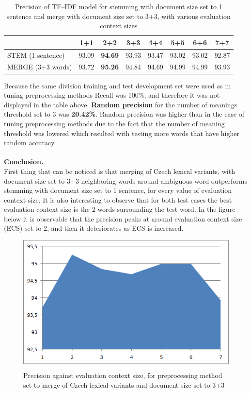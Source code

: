 \begin{table}[h!]
\begin{tabular}{ l | c c c c c c c}
    &  1+1 & 2+2 & 3+3 & 4+4 & 5+5 & 6+6 & 7+7 \\
\hline
STEM (1 sentence)  & 93.09 & \textbf{94.69} & 93.93 & 93.47 & 93.02 & 93.02 & 92.87 \\
MERGE (3+3 words) & 93.72 & \textbf{95.26} & 94.84 & 94.69 & 94.99 & 94.99 & 93.93 \\
\end{tabular}
\caption{Precision of TF--IDF model for stemming with document size set to 1 sentence and merge with document size set to 3+3, with various evaluation context sizes}
\end{table} 

Because the same division training and test development set were used as in tuning preprocessing methods Recall was 100\%, and therefore it was not displayed in the table above. 
\textbf{Random precision} for the number of meanings threshold set to 3 was \textbf{20.42\%}. Random precision was higher than in the case of tuning preprocessing methods due to the fact that the number of meaning threshold was lowered which resulted with testing more words that have higher random accuracy. 
\\\\
\textbf{Conclusion.}\\
First thing that can be noticed is that merging of Czech lexical variants, with document size set to 3+3 
neighboring words around ambiguous word outperforms stemming with document size set to 1 sentence, 
for every value of evaluation context size. It is also interesting to observe that for both test cases the best 
evaluation context size is the 2 words surrounding the test word. In the figure below it is observable that 
the precision peaks at around evaluation context size (ECS) set to 2, and then it deteriorates as ECS is increased.
\begin{figure}[h!]
\includegraphics{img/precision-evalContSize_merge.png}
\caption{Precision against evaluation context size, for preprocessing method set to merge of Czech lexical variants and document size set to 3+3}
\end{figure}

